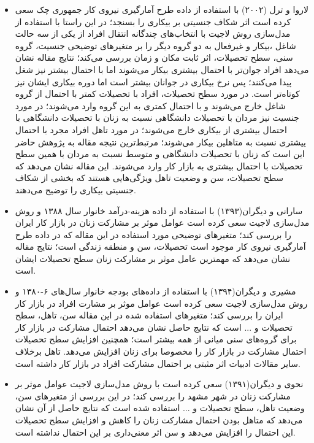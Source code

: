 \documentclass[12pt, a4paper]{article}
\begin{document}
\begin{itemize}
 \item
 لاروا و ترل (۲۰۰۲) 
 با استفاده از داده طرح آمارگیری نیروی کار جمهوری چک سعی کرده است اثر شکاف جنسیتی بر بیکاری را بسنجد؛ در این راستا با استفاده از مدل‌سازی روش لاجیت با انتخاب‌های چندگانه انتقال افراد از  یکی از سه حالت شاغل ،بیکار و غیرفعال  به دو گروه دیگر را بر متغیرهای توضیحی جنسیت، گروه سنی، سطح تحصیلات، اثر ثابت مکان و زمان بررسی می‌کند؛ نتایج مقاله نشان می‌دهد افراد جوان‌تر با احتمال بیشتری بیکار می‌شوند اما با احتمال بیشتر نیز شغل پیدا می‌کنند؛ پس نرخ بیکاری در جوانان بیشتر است اما دوره بیکاری ایشان نیز کوتاه‌تر است. در مورد سطح تحصیلات، افراد با تحصیلات کمتر با احتمال از گروه شاغل خارج می‌شوند و با احتمال کمتری به این گروه وارد می‌شوند؛ در مورد جنسیت نیز مردان با تحصیلات دانشگاهی  نسبت به زنان با تحصیلات دانشگاهی با احتمال بیشتری از بیکاری خارج می‌شوند؛  در مورد تاهل افراد مجرد با احتمال ییشتری نسبت به متاهلین بیکار می‌شوند؛ مرتبط‌ترین نتیجه مقاله به پژوهش حاضر این است که زنان با تحصیلات دانشگاهی و متوسط نسبت به مردان با همین سطح تحصیلات با احتمال بیشتری به بازار کار وارد می‌شوند. این مقاله نشان می‌دهد که سطح تحصیلات، سن و وضعیت تاهل ویژگی‌هایی هستند که بخشی از شکاف جنسیتی بیکاری را توضیح می‌دهند.
  \item
سارانی و دیگران(۱۳۹۳) با استفاده از داده هزینه-درآمد خانوار سال ۱۳۸۸ و روش مدل‌سازی لاجیت سعی کرده است عوامل موثر بر مشارکت زنان در بازار کار ایران را بررسی کند؛ متغیرهای توضیحی مورد استفاده در این مقاله که در داده طرح آمارگیری نیروی کار موجود است تحصیلات، سن و منطقه زندگی است؛ نتایج مقاله نشان می‌دهد که مهمترین عامل موثر بر مشارکت زنان سطح تحصیلات ایشان است.
   \item
 مشیری و دیگران(۱۳۹۴) با استفاده از داده‌های بودجه خانوار سال‌های ۶-۱۳۸۰ و روش مدل‌سازی لاجیت سعی کرده است عوامل موثر بر مشارت افراد در بازار کار ایران را بررسی کند؛ متغیرهای استفاده شده در این مقاله سن، تاهل، سطح تحصیلات و ... است که نتایج حاصل نشان می‌دهد احتمال مشارکت در بازار کار برای گروه‌های سنی میانی از همه بیشتر است؛ همچنین افزایش سطح تحصیلات احتمال مشارکت در بازار کار را مخصوصا برای زنان افزایش می‌دهد. تاهل برخلاف سایر مقالات ادبیات اثر مثبتی بر احتمال مشارکت افراد در بازار کار داشته است.
 \item
 نحوی و دیگران(۱۳۹۱) سعی کرده است با روش مدل‌سازی لاجیت عوامل موثر بر مشارکت زنان در شهر مشهد را بررسی کند؛ در این بررسی از متغیرهای سن، وضعیت تاهل، سطح تحصیلات و ... استفاده شده است که نتایج حاصل از آن نشان می‌دهد که متاهل بودن احتمال مشارکت زنان را کاهش و افزایش سطح تحصیلات این احتمال را افزایش می‌دهد و سن اثر معنی‌داری بر این احتمال نداشته است.
\end{itemize}
\end{document}
